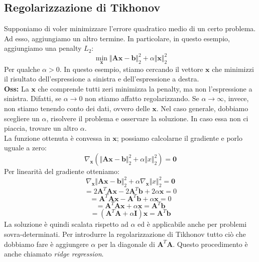 \documentclass{article}
\begin{document}
        \subsection{Regolarizzazione di Tikhonov}
            Supponiamo di voler minimizzare l'errore quadratico medio di un certo problema. Ad esso, aggiungiamo un altro termine. In 
            particolare, in questo esempio, aggiungiamo una penalty $L_2$:
            \[ \min_\mathbf{x} \Vert \mathbf{Ax} - \mathbf{b} \Vert_2^2 + \alpha \Vert \mathbf{x} \Vert_2^2 \]
            Per qualche $\alpha > 0$. In questo esempio, stiamo cercando il vettore $\mathbf{x}$ che minimizzi il risultato dell'espressione 
            a sinistra e dell'espressione a destra. \\
            \textbf{Oss:} La $\mathbf{x}$ che comprende tutti zeri minimizza la penalty, ma non l'espressione a sinistra. Difatti, se $\alpha \to 0$
            non stiamo affatto regolarizzando. Se $\alpha \to \infty$, invece, non stiamo tenendo conto dei dati, ovvero delle $\mathbf{x}$. Nel caso 
            generale, dobbiamo scegliere un $\alpha$, risolvere il problema e osservare la soluzione. In caso essa non ci piaccia, trovare un altro 
            $\alpha$. \\
            La funzione ottenuta è convessa in $\mathbf{x}$; possiamo calcolarne il gradiente e porlo uguale a zero:
            \[ \nabla_\mathbf{x} ( \Vert \mathbf{Ax} - \mathbf{b} \Vert_2^2 + \alpha \Vert x \Vert_2^2) = \mathbf{0}\]
            Per linearità del gradiente otteniamo:
            \[ \nabla_\mathbf{x}  \Vert \mathbf{Ax} - \mathbf{b} \Vert_2^2 + \alpha \nabla_\mathbf{x} \Vert x \Vert_2^2 = \mathbf{0}\]
            \[ = 2\mathbf{A}^T\mathbf{Ax} - 2\mathbf{A}^T\mathbf{b} + 2\alpha\mathbf{x} = 0\]
            \[ = \mathbf{A}^T\mathbf{Ax} - \mathbf{A}^T\mathbf{b} + \alpha\mathbf{x} = 0\]
            \[ = \mathbf{A}^T\mathbf{Ax} + \alpha\mathbf{x} =  \mathbf{A}^T\mathbf{b} \]
            \[ = (\mathbf{A}^T\mathbf{A} + \alpha \mathbf{I})\mathbf{x} = \mathbf{A}^T\mathbf{b}\]
            La soluzione è quindi scalata rispetto ad $\alpha$ ed è applicabile anche per problemi sovra-determinati. Per introdurre la 
            regolarizzazione di Tikhonov tutto ciò che dobbiamo fare è aggiungere $\alpha$ per la diagonale di $\mathbf{A}^T\mathbf{A}$. 
            Questo procedimento è anche chiamato \emph{ridge regression}.
\end{document}
